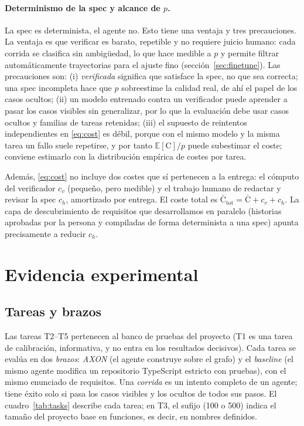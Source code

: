 \documentclass[11pt, a4paper]{article}
\newcommand{\cost}{\mathrm{C}}
\newcommand{\Esp}{\mathbb{E}}
\begin{document}
\paragraph{Determinismo de la spec y alcance de $p$.} La spec es determinista, el agente no. Esto tiene una ventaja y tres precauciones. La ventaja es que verificar es barato, repetible y no requiere juicio humano: cada corrida se clasifica sin ambigüedad, lo que hace medible a $p$ y permite filtrar automáticamente trayectorias para el ajuste fino (sección~\ref{sec:finetune}). Las precauciones son: (i) \emph{verificada} significa que satisface la spec, no que sea correcta; una spec incompleta hace que $p$ sobreestime la calidad real, de ahí el papel de los casos ocultos; (ii) un modelo entrenado contra un verificador puede aprender a pasar los casos visibles sin generalizar, por lo que la evaluación debe usar casos ocultos y familias de tareas retenidas; (iii) el supuesto de reintentos independientes en \eqref{eq:cost} es débil, porque con el mismo modelo y la misma tarea un fallo suele repetirse, y por tanto $\Esp[\cost]/p$ puede subestimar el coste; conviene estimarlo con la distribución empírica de costes por tarea.

Además, \eqref{eq:cost} no incluye dos costes que sí pertenecen a la entrega: el cómputo del verificador $c_v$ (pequeño, pero medible) y el trabajo humano de redactar y revisar la spec $c_h$, amortizado por entrega. El coste total es $\bar{\cost}_{\mathrm{tot}}=\bar{\cost}+c_v+c_h$. La capa de descubrimiento de requisitos que desarrollamos en paralelo (historias aprobadas por la persona y compiladas de forma determinista a una spec) apunta precisamente a reducir $c_h$.

\section{Evidencia experimental}
\label{sec:evidence}

\subsection{Tareas y brazos}
\label{sec:tasks}

Las tareas T2--T5 pertenecen al banco de pruebas del proyecto (T1 es una tarea de calibración, informativa, y no entra en los resultados decisivos). Cada tarea se evalúa en dos \emph{brazos}: \emph{AXON} (el agente construye sobre el grafo) y el \emph{baseline} (el mismo agente modifica un repositorio TypeScript estricto con pruebas), con el mismo enunciado de requisitos. Una \emph{corrida} es un intento completo de un agente; tiene éxito solo si pasa los casos visibles y los ocultos de todos sus pasos. El cuadro~\ref{tab:tasks} describe cada tarea; en T3, el sufijo (100 o 500) indica el tamaño del proyecto base en funciones, es decir, en nombres definidos.
\end{document}
